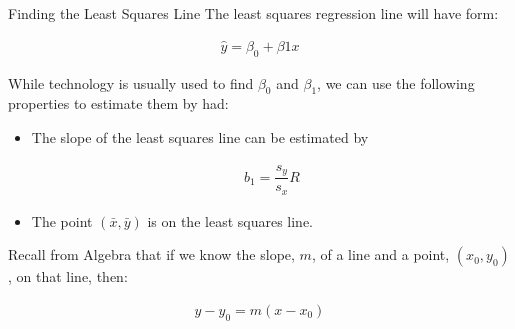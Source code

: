 \documentclass{beamer}
\begin{document}
\begin{frame}
  \begin{block}{Finding the Least Squares Line}
    The least squares regression line will have form:

    \vspace{-4mm}
    \begin{equation*}
      \begin{aligned}
        \hat{y} = \beta_{0} + \beta{1} x
      \end{aligned}
    \end{equation*}\pause

    \vspace{-5mm}
    While technology is usually used to find $\beta_0$ and $\beta_1$, we can use the following properties to estimate them by had:
    \begin{itemize}
    \item The slope of the least squares line can be estimated by

      \vspace{-2mm}
      \begin{equation*}
        \begin{aligned}
          b_1 = \dfrac{s_y}{s_x} R
        \end{aligned}
      \end{equation*}\pause

      \vspace{-4mm}
      \item The point $(\bar{x},\bar{y})$ is on the least squares line.
    \end{itemize}
  \end{block}\pause

  \begin{note}
    Recall from Algebra that if we know the slope, $m$, of a line and a point, $(x_0,y_0)$, on that line, then:

    \vspace{-4mm}
    \begin{equation*}
      \begin{aligned}
        y-y_0=m(x-x_0)
      \end{aligned}
    \end{equation*}
  \end{note}
\end{frame}
\end{document}
